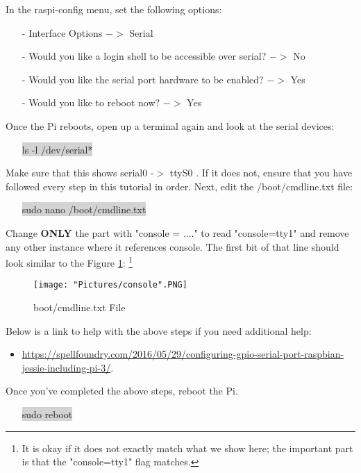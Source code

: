 \documentclass[12pt]{article}
\begin{document}
\noindent In the raspi-config menu, set the following options:
\begin{itemize}
	\item[-]  Interface Options $-> $ Serial 
	\item[-] Would you like a login shell to be accessible over serial? $->$ No
	\item[-] Would you like the serial port hardware to be enabled? $->$ Yes
	\item[-] Would you like to reboot now? $->$ Yes
\end{itemize} 
\noindent Once the Pi reboots, open up a terminal again and look at the serial devices:
\begin{itemize}
	\item[] \colorbox{lightgray}{ls -l /dev/serial*}
\end{itemize}
Make sure that this shows serial0 -$>$ ttyS0 . If it does not, ensure that you have followed every step in this tutorial in order. Next, edit the /boot/cmdline.txt file:
\begin{itemize}
	\item [] \colorbox{lightgray}{sudo nano /boot/cmdline.txt}
\end{itemize}

\noindent Change \textbf{ONLY} the part with "console = ...." to read "console=tty1" and remove any other instance where it references console. The first bit of that line should look similar to the Figure \ref{console}: \footnote{It is okay if it does not exactly match what we show here; the important part is that the "console=tty1" flag matches.}

\begin{figure}[H]
 	\centering
	\texttt{[image: "Pictures/console".PNG]}
 	\caption{boot/cmdline.txt File}
	\label{console}
\end{figure}

\noindent Below is a link to help with the above steps if you need additional help:
\begin{itemize}
	\item \href{https://spellfoundry.com/2016/05/29/configuring-gpio-serial-port-raspbian-jessie-including-pi-3/}{https://spellfoundry.com/2016/05/29/configuring-gpio-serial-port-raspbian-jessie-including-pi-3/}. 
\end{itemize}
\noindent Once you've completed the above steps, reboot the Pi.
\begin{itemize}
	\item[] \colorbox{lightgray}{sudo reboot}
\end{itemize}
\end{document}
